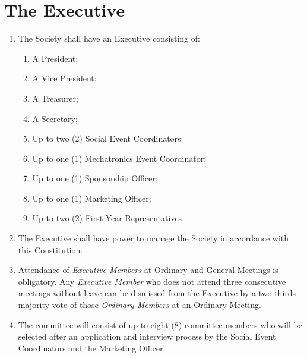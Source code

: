 \documentclass[11pt]{article}
\begin{document}
\section{The Executive}
\begin{enumerate}[\thesection .1]
    \item The Society shall have an Executive consisting of:
    \begin{enumerate}
        \item A President;
        \item A Vice President;
        \item A Treasurer;
        \item A Secretary;
        \item Up to two (2) Social Event Coordinators;
        \item Up to one (1) Mechatronics Event Coordinator;
        \item Up to one (1) Sponsorship Officer;
        \item Up to one (1) Marketing Officer;
        \item Up to two (2) First Year Representatives.
    \end{enumerate}
    \item The Executive shall have power to manage the Society in accordance with this Constitution.
    \item Attendance of \textit{Executive Members} at Ordinary and General Meetings is obligatory. Any \textit{Executive Member} who does not attend three consecutive meetings without leave can be dismissed from the Executive by a two-thirds majority vote of those \textit{Ordinary Members} at an Ordinary Meeting.
    \item The committee will consist of up to eight (8) committee members who will be selected after an application and interview process by the Social Event Coordinators and the Marketing Officer.
\end{enumerate}
\end{document}
